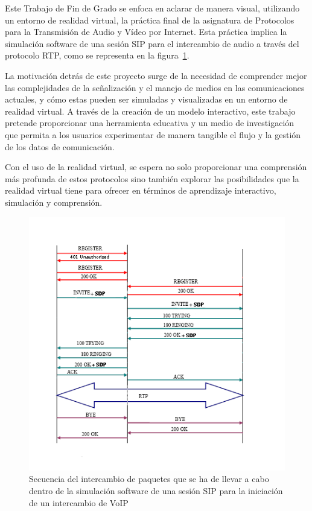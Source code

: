 \documentclass[a4paper, 12pt]{book}
\begin{document}
\bigskip

Este Trabajo de Fin de Grado se enfoca en aclarar de manera visual, utilizando un entorno de realidad virtual, la práctica final 
de la asignatura de Protocolos para la Transmisión de Audio y Vídeo por Internet. Esta práctica implica la simulación software de una sesión SIP para el 
intercambio de audio a través del protocolo RTP, como se representa en la figura~\ref{fig:Secuencia_Paquetes_intro}.

\bigskip

La motivación detrás de este proyecto surge de la necesidad de comprender mejor las complejidades de la señalización y 
el manejo de medios en las comunicaciones actuales, y cómo estas pueden ser simuladas y visualizadas en un entorno de realidad virtual. 
A través de la creación de un modelo interactivo, este trabajo pretende proporcionar una herramienta educativa y un medio de 
investigación que permita a los usuarios experimentar de manera tangible el flujo y la gestión de los datos de comunicación.

\bigskip

Con el uso de la realidad virtual, se espera no solo proporcionar una comprensión más profunda de estos protocolos sino también explorar 
las posibilidades que la realidad virtual tiene para ofrecer en términos de aprendizaje interactivo, simulación y comprensión.

\begin{figure}
  \centering
  \includegraphics[width=15cm, keepaspectratio]{img/resultados/Secuencia_Paquetes.png}
  \caption{Secuencia del intercambio de paquetes que se ha de llevar a cabo dentro de la simulación software de una sesión SIP para la iniciación de un intercambio de VoIP}
  \label{fig:Secuencia_Paquetes_intro}
\end{figure}
\end{document}

